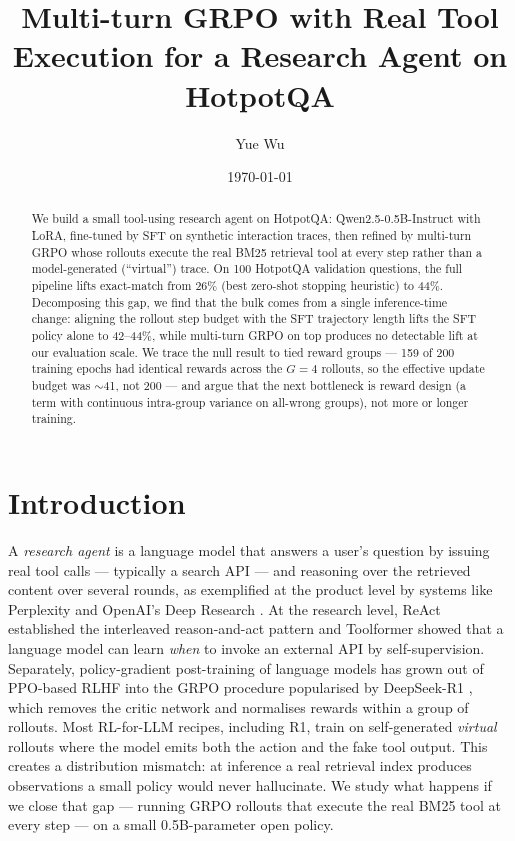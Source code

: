 \documentclass[11pt]{article}
\title{\vspace{-3em}Multi-turn GRPO with Real Tool Execution for a Research Agent on HotpotQA}
\author{Yue Wu}
\date{\vspace{-0.5em}\today}
\begin{document}
\maketitle
\vspace{-1.5em}

\begin{abstract}
\noindent
We build a small tool-using research agent on HotpotQA:
Qwen2.5-0.5B-Instruct with LoRA, fine-tuned by SFT on synthetic
interaction traces, then refined by multi-turn GRPO whose rollouts
execute the real BM25 retrieval tool at every step rather than a
model-generated (``virtual'') trace. On 100 HotpotQA validation
questions, the full pipeline lifts exact-match from 26\% (best
zero-shot stopping heuristic) to 44\%. Decomposing this gap, we
find that the bulk comes from a single inference-time change:
aligning the rollout step budget with the SFT trajectory length
lifts the SFT policy alone to 42--44\%, while multi-turn GRPO on
top produces no detectable lift at our evaluation scale. We trace
the null result to tied reward groups --- 159 of 200 training
epochs had identical rewards across the $G{=}4$ rollouts, so the
effective update budget was $\sim$41, not 200 --- and argue that
the next bottleneck is reward design (a term with continuous
intra-group variance on all-wrong groups), not more or longer
training.
\end{abstract}

\vspace{-0.5em}

\section{Introduction}
\label{sec:intro}

A \emph{research agent} is a language model that answers a user's
question by issuing real tool calls --- typically a search API
--- and reasoning over the retrieved content over several
rounds, as exemplified at the product level by systems like
Perplexity and OpenAI's Deep Research \cite{deep-research}. At
the research level, ReAct \cite{react} established the
interleaved reason-and-act pattern and Toolformer
\cite{toolformer} showed that a language model can learn
\emph{when} to invoke an external API by self-supervision.
Separately, policy-gradient post-training of language models has
grown out of PPO-based RLHF \cite{rlhf-instructgpt} into the
GRPO procedure popularised by DeepSeek-R1 \cite{deepseek-r1},
which removes the critic network and normalises rewards within a
group of rollouts. Most RL-for-LLM recipes, including R1, train
on self-generated \emph{virtual} rollouts where the model emits
both the action and the fake tool output. This creates a
distribution mismatch: at inference a real retrieval index
produces observations a small policy would never hallucinate. We
study what happens if we close that gap --- running GRPO rollouts
that execute the real BM25 tool at every step --- on a small
0.5B-parameter open policy.
\end{document}
